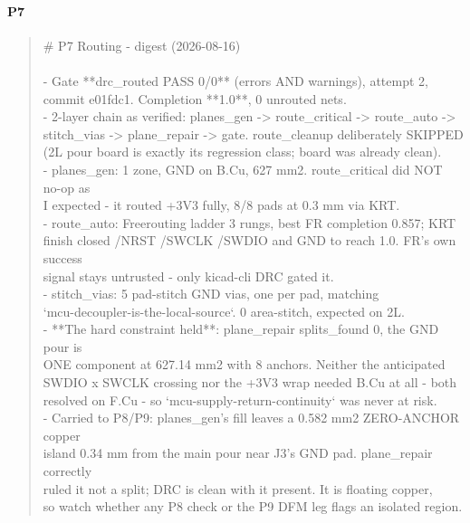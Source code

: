 \documentclass[11pt,a4paper]{article}
\begin{document}
\paragraph*{P7}
\begin{quote}\small\ttfamily\raggedright
\# P7 Routing - digest (2026-08-16)\\
~\\
- Gate {*}{*}drc\_routed PASS 0/0{*}{*} (errors AND warnings), attempt 2,\\
  commit e01fdc1. Completion {*}{*}1.0{*}{*}, 0 unrouted nets.\\
- 2-layer chain as verified: planes\_gen -\textgreater{} route\_critical -\textgreater{} route\_auto -\textgreater{}\\
  stitch\_vias -\textgreater{} plane\_repair -\textgreater{} gate. route\_cleanup deliberately SKIPPED\\
  (2L pour board is exactly its regression class; board was already clean).\\
- planes\_gen: 1 zone, GND on B.Cu, 627 mm2. route\_critical did NOT no-op as\\
  I expected - it routed +3V3 fully, 8/8 pads at 0.3 mm via KRT.\\
- route\_auto: Freerouting ladder 3 rungs, best FR completion 0.857; KRT\\
  finish closed /NRST /SWCLK /SWDIO and GND to reach 1.0. FR's own success\\
  signal stays untrusted - only kicad-cli DRC gated it.\\
- stitch\_vias: 5 pad-stitch GND vias, one per pad, matching\\
  `mcu-decoupler-is-the-local-source`. 0 area-stitch, expected on 2L.\\
- {*}{*}The hard constraint held{*}{*}: plane\_repair splits\_found 0, the GND pour is\\
  ONE component at 627.14 mm2 with 8 anchors. Neither the anticipated\\
  SWDIO x SWCLK crossing nor the +3V3 wrap needed B.Cu at all - both\\
  resolved on F.Cu - so `mcu-supply-return-continuity` was never at risk.\\
- Carried to P8/P9: planes\_gen's fill leaves a 0.582 mm2 ZERO-ANCHOR copper\\
  island 0.34 mm from the main pour near J3's GND pad. plane\_repair correctly\\
  ruled it not a split; DRC is clean with it present. It is floating copper,\\
  so watch whether any P8 check or the P9 DFM leg flags an isolated region.
\end{quote}
\end{document}
